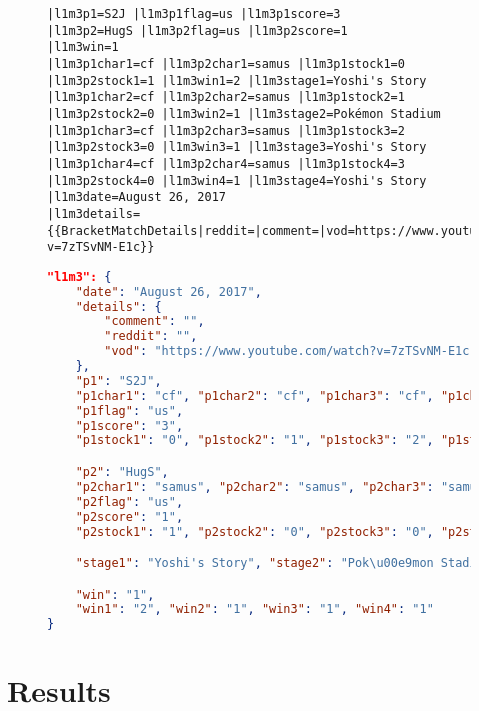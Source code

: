 \documentclass[10pt]{article}
\theoremstyle{definition}
\theoremstyle{remark}
\begin{document}
\begin{figure}[!ht]
    \begin{minipage}[t][][t]{.46\textwidth}
        \begin{lstlisting}
|l1m3p1=S2J |l1m3p1flag=us |l1m3p1score=3
|l1m3p2=HugS |l1m3p2flag=us |l1m3p2score=1
|l1m3win=1
|l1m3p1char1=cf |l1m3p2char1=samus |l1m3p1stock1=0 |l1m3p2stock1=1 |l1m3win1=2 |l1m3stage1=Yoshi's Story
|l1m3p1char2=cf |l1m3p2char2=samus |l1m3p1stock2=1 |l1m3p2stock2=0 |l1m3win2=1 |l1m3stage2=Pokémon Stadium
|l1m3p1char3=cf |l1m3p2char3=samus |l1m3p1stock3=2 |l1m3p2stock3=0 |l1m3win3=1 |l1m3stage3=Yoshi's Story
|l1m3p1char4=cf |l1m3p2char4=samus |l1m3p1stock4=3 |l1m3p2stock4=0 |l1m3win4=1 |l1m3stage4=Yoshi's Story
|l1m3date=August 26, 2017
|l1m3details={{BracketMatchDetails|reddit=|comment=|vod=https://www.youtube.com/watch?v=7zTSvNM-E1c}}
        \end{lstlisting}
    \end{minipage} \hfill
    \begin{minipage}[t][][t]{.5\textwidth}
        \begin{lstlisting}[language=json]
"l1m3": {
    "date": "August 26, 2017",
    "details": {
        "comment": "",
        "reddit": "",
        "vod": "https://www.youtube.com/watch?v=7zTSvNM-E1c"
    },
    "p1": "S2J",
    "p1char1": "cf", "p1char2": "cf", "p1char3": "cf", "p1char4": "cf",
    "p1flag": "us",
    "p1score": "3",
    "p1stock1": "0", "p1stock2": "1", "p1stock3": "2", "p1stock4": "3",

    "p2": "HugS",
    "p2char1": "samus", "p2char2": "samus", "p2char3": "samus", "p2char4": "samus",
    "p2flag": "us",
    "p2score": "1",
    "p2stock1": "1", "p2stock2": "0", "p2stock3": "0", "p2stock4": "0",

    "stage1": "Yoshi's Story", "stage2": "Pok\u00e9mon Stadium", "stage3": "Yoshi's Story", "stage4": "Yoshi's Story",

    "win": "1",
    "win1": "2", "win2": "1", "win3": "1", "win4": "1"
}
        \end{lstlisting}
    \end{minipage}
\end{figure}

\section{Results}
\end{document}
